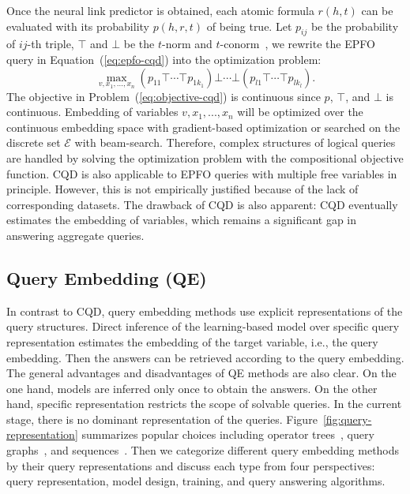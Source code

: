 \documentclass[11pt]{article}
\newcommand{\entity}{\mathcal{E}}
\begin{document}
Once the neural link predictor is obtained, each atomic formula $r(h, t)$ can be evaluated with its probability $p(h, r, t)$ of being true. Let $p_{ij}$ be the probability of $ij$-th triple, $\top$ and $\bot$ be the $t$-norm and $t$-conorm~\cite{Hajek1998MetamathematicsFuzzy}, we rewrite the EPFO query in Equation~(\ref{eq:epfo-cqd}) into the optimization problem:
\begin{equation}\label{eq:objective-cqd}
    \max_{v, x_1, ..., x_n} (p_{11}\top \cdots \top p_{1k_1}) \bot \cdots \bot (p_{l1}\top \cdots \top p_{lk_l}).
\end{equation}
The objective in Problem~(\ref{eq:objective-cqd}) is continuous since $p$, $\top$, and $\bot$ is continuous. Embedding of variables $v, x_1, ..., x_n$ will be optimized over the continuous embedding space with gradient-based optimization or searched on the discrete set $\entity$ with beam-search.
Therefore, complex structures of logical queries are handled by solving the optimization problem with the compositional objective function.
CQD is also applicable to EPFO queries with multiple free variables in principle. However, this is not empirically justified because of the lack of corresponding datasets.
The drawback of CQD is also apparent: CQD eventually estimates the embedding of variables, which remains a significant gap in answering aggregate queries.

\subsection{Query Embedding (QE)}\label{sec:qe}
In contrast to CQD, query embedding methods use explicit representations of the query structures. Direct inference of the learning-based model over specific query representation estimates the embedding of the target variable, i.e., the query embedding. Then the answers can be retrieved according to the query embedding.
The general advantages and disadvantages of QE methods are also clear. On the one hand, models are inferred only once to obtain the answers. On the other hand, specific representation restricts the scope of solvable queries.
In the current stage, there is no dominant representation of the queries. Figure~\ref{fig:query-representation} summarizes popular choices including operator trees~\cite{Wang2021BenchmarkingCombinatorial}, query graphs~\cite{Liu2022MaskReason}, and sequences~\cite{Kotnis2021AnsweringComplex}.
Then we categorize different query embedding methods by their query representations and discuss each type from four perspectives: query representation, model design, training, and query answering algorithms.
\end{document}
